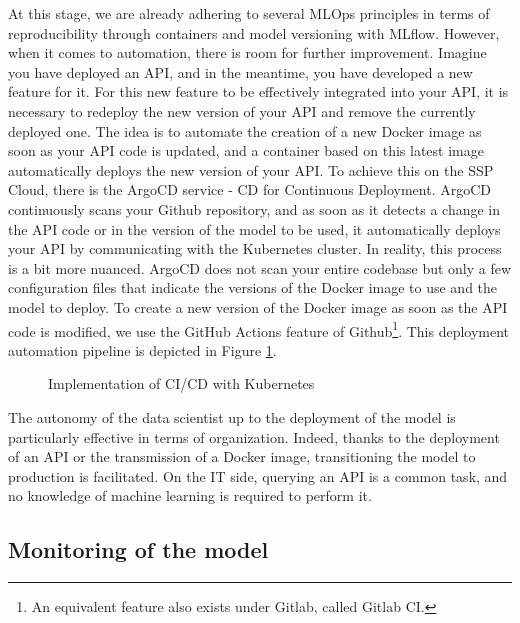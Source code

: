 At this stage, we are already adhering to several MLOps principles in terms of reproducibility through containers and model versioning with MLflow. However, when it comes to automation, there is room for further improvement. Imagine you have deployed an API, and in the meantime, you have developed a new feature for it. For this new feature to be effectively integrated into your API, it is necessary to redeploy the new version of your API and remove the currently deployed one. The idea is to automate the creation of a new Docker image as soon as your API code is updated, and a container based on this latest image automatically deploys the new version of your API. To achieve this on the SSP Cloud, there is the ArgoCD service - CD for Continuous Deployment. ArgoCD continuously scans your Github repository, and as soon as it detects a change in the API code or in the version of the model to be used, it automatically deploys your API by communicating with the Kubernetes cluster. In reality, this process is a bit more nuanced. ArgoCD does not scan your entire codebase but only a few configuration files that indicate the versions of the Docker image to use and the model to deploy. To create a new version of the Docker image as soon as the API code is modified, we use the GitHub Actions feature of Github\footnote{An equivalent feature also exists under Gitlab, called Gitlab CI.}. This deployment automation pipeline is depicted in Figure \ref{fig:ci-cd}.

\begin{figure}[htbp]
    \centering
    \caption{Implementation of CI/CD with Kubernetes}
    \label{fig:ci-cd}
\end{figure}

The autonomy of the data scientist up to the deployment of the model is particularly effective in terms of organization. Indeed, thanks to the deployment of an API or the transmission of a Docker image, transitioning the model to production is facilitated. On the IT side, querying an API is a common task, and no knowledge of machine learning is required to perform it.

\subsection{Monitoring of the model}


